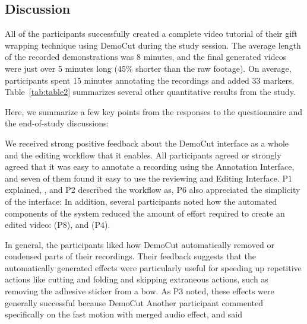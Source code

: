 \subsection{Discussion}
All of the participants successfully created a complete video tutorial
of their gift wrapping technique using DemoCut during the study
session. The average length of the recorded demonstrations was 8
minutes, and the final generated videos were just over 5 minutes long
(45\% shorter than the raw footage). On average, participants spent 15
minutes annotating the recordings and added 33
markers. Table~\ref{tab:table2} summarizes several other quantitative
results from the study.

Here, we summarize a few key points from the responses to the
questionnaire and the end-of-study discussions:

We received strong positive
feedback about the DemoCut interface as a whole and the editing
workflow that it enables. All participants agreed or strongly agreed that
it was easy to annotate a recording using the Annotation Interface, and seven
of them found it easy to use the reviewing and Editing Interface.
%
P1 explained, ,
and P2 described the workflow as, 
%
P6 also appreciated the simplicity of the interface: 
%
In addition, several participants noted how the automated components
of the system reduced the amount of effort required to create an
edited video:  (P8), and  (P4).

 In general, the participants
liked how DemoCut automatically removed or condensed parts of their
recordings. Their feedback suggests that the automatically generated
effects were particularly useful for speeding up repetitive actions
like cutting and folding and skipping extraneous actions, such as removing
the adhesive sticker from a bow. As P3 noted, these effects were generally successful because
DemoCut  Another participant commented specifically
on the fast motion with merged audio effect, and said 

